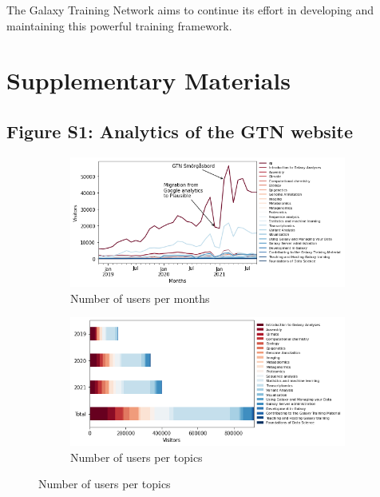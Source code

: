 \documentclass[10pt,letterpaper]{article}
\begin{document}
The Galaxy Training Network aims to continue its effort in developing and maintaining this powerful training framework.





\clearpage
\section*{Supplementary Materials}

\subsection*{Figure S1: Analytics of the GTN website}

\begin{figure}[!ht]
    \centering
    \begin{subfigure}[b]{0.45\textwidth}
         \centering
         \includegraphics[width=\textwidth]{images/analytics-all-users.png}
         \caption{Number of users per months}
         \label{fig:analytics-all-users}
    \end{subfigure}
    \hfill
    \begin{subfigure}[b]{0.45\textwidth}
         \centering
         \includegraphics[width=\textwidth]{images/analytics-topics-users.png}
         \caption{Number of users per topics}
         \label{fig:analytics-topics-users}

\end{subfigure}
\end{figure}
\end{document}
